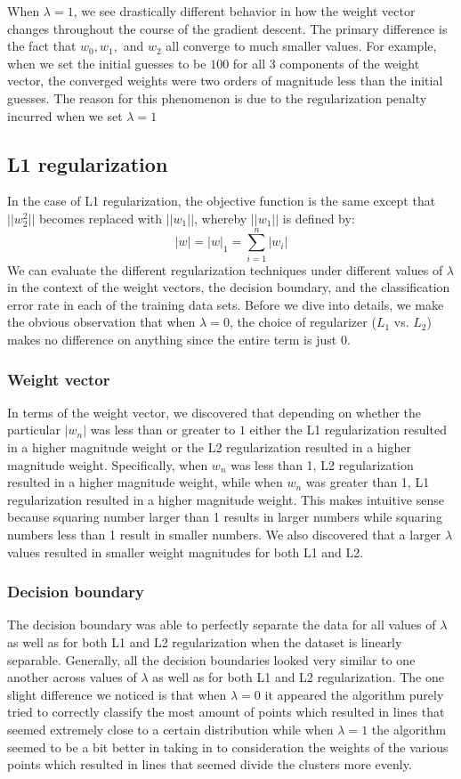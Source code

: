 \documentclass{article}
\begin{document}
When $\lambda = 1$, we see drastically different behavior in how the weight vector changes throughout the course of the gradient descent. The primary difference is the fact that $w_{0}, w_{1},$ and $w_{2}$ all converge to much smaller values. For example, when we set the initial guesses to be $100$ for all 3 components of the weight vector, the converged weights were two orders of magnitude less than the initial guesses. The reason for this phenomenon is due to the regularization penalty incurred when we set $\lambda = 1$

\subsection{L1 regularization}
In the case of L1 regularization, the objective function is the same except that $||w^2_2||$ becomes replaced with $||w_1||$, whereby $||w_1||$ is defined by:
$$|w| = |w|_1 = \sum_{i=1}^n |w_i|$$
We can evaluate the different regularization techniques under different values of $\lambda$ in the context of the weight vectors, the decision boundary, and the classification error rate in each of the training data sets. Before we dive into details, we make the obvious observation that when $\lambda = 0$, the choice of regularizer ($L_1$ vs. $L_2$) makes no difference on anything since the entire term is just $0$.

\subsubsection{Weight vector}
In terms of the weight vector, we discovered that depending on whether the particular $|w_n|$ was less than or greater to $1$ either the L1 regularization resulted in a higher magnitude weight or the L2 regularization resulted in a higher magnitude weight. Specifically, when $w_n$ was less than 1, L2 regularization resulted in a higher magnitude weight, while when $w_n$ was greater than 1, L1 regularization resulted in a higher magnitude weight.   This makes intuitive sense because squaring number larger than 1 results in larger numbers while squaring numbers less than 1 result in smaller numbers. We also discovered that a larger $\lambda$ values resulted in smaller weight magnitudes for both L1 and L2.

\subsubsection{Decision boundary}
The decision boundary was able to perfectly separate the data for all values of $\lambda$ as well as for both L1 and L2 regularization when the dataset is linearly separable. Generally, all the decision boundaries looked very similar to one another across values of $\lambda$ as well as for both L1 and L2 regularization. The one slight difference we noticed is that when $\lambda = 0$ it appeared the algorithm purely tried to correctly classify the most amount of points which resulted in lines that seemed extremely close to a certain distribution while when $\lambda =1$ the algorithm seemed to be a bit better in taking in to consideration the weights of the various points which resulted in lines that seemed divide the clusters more evenly.
\end{document}
